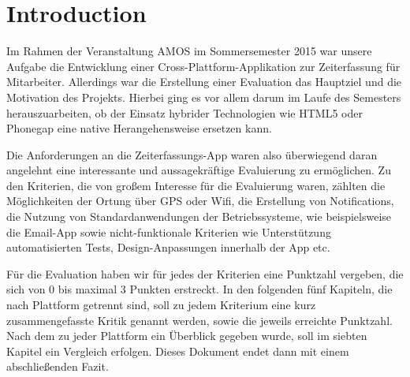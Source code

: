 \section{Introduction}
Im Rahmen der Veranstaltung AMOS im Sommersemester 2015 war unsere Aufgabe die Entwicklung einer Cross-Platt\-form-Applikation zur Zeiterfassung für Mitarbeiter. Allerdings war die Erstellung einer Evaluation das Hauptziel und die Motivation des Projekts. Hierbei ging es vor allem darum im Laufe des Semesters herauszuarbeiten, ob der Einsatz hybrider Technologien wie HTML5 oder Phonegap eine native Herangehensweise ersetzen kann.

Die Anforderungen an die Zeiterfassungs-App waren also überwiegend daran angelehnt eine interessante und aus\-sage\-kräftige Evaluierung zu ermöglichen. Zu den Kriterien, die von großem Interesse für die Evaluierung waren, zählten die Möglichkeiten der Ortung über GPS oder Wifi, die Erstellung von Notifications, die Nutzung von Standardanwendungen der Betriebssysteme, wie beispielsweise die Email-App sowie nicht-funktionale Kriterien wie Unterstützung automatisierten Tests, Design-Anpassungen innerhalb der App etc.

Für die Evaluation haben wir für jedes der Kriterien eine Punktzahl vergeben, die sich von 0 bis maximal 3 Punkten erstreckt. In den folgenden fünf Kapiteln, die nach Plattform getrennt sind, soll zu jedem Kriterium eine kurz zusammengefasste Kritik genannt werden, sowie die jeweils erreichte Punktzahl. Nach dem zu jeder Plattform ein Überblick gegeben wurde, soll im siebten Kapitel ein Vergleich erfolgen. Dieses Dokument endet dann mit einem abschließenden Fazit.


